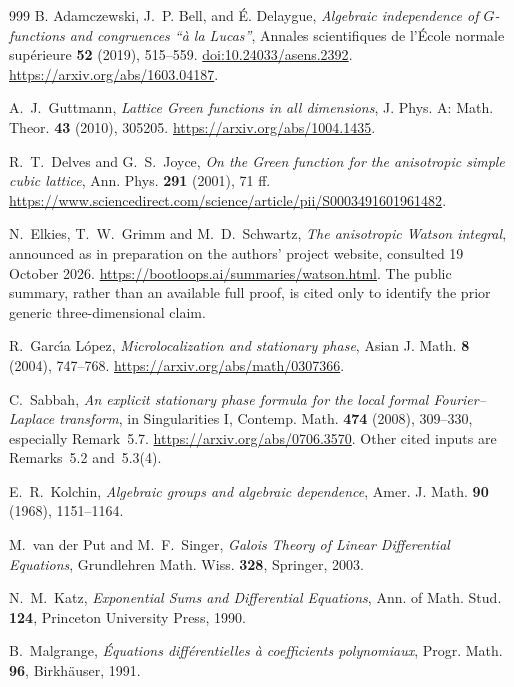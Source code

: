 \documentclass[11pt,a4paper]{article}
\theoremstyle{definition}
\theoremstyle{remark}
\numberwithin{equation}{section}
\begin{document}
\begin{thebibliography}{999}
B. Adamczewski, J.~P. Bell, and \'E. Delaygue,
\emph{Algebraic independence of $G$-functions and congruences
``\`a la Lucas''},
Annales scientifiques de l'\'Ecole normale sup\'erieure
\textbf{52} (2019), 515--559.
\href{https://doi.org/10.24033/asens.2392}{doi:10.24033/asens.2392}.
\url{https://arxiv.org/abs/1603.04187}.

A.~J.~Guttmann, \emph{Lattice Green functions in all dimensions},
J. Phys. A: Math. Theor. \textbf{43} (2010), 305205.
\url{https://arxiv.org/abs/1004.1435}.

R.~T.~Delves and G.~S.~Joyce,
\emph{On the Green function for the anisotropic simple cubic lattice},
Ann. Phys. \textbf{291} (2001), 71 ff.
\url{https://www.sciencedirect.com/science/article/pii/S0003491601961482}.

N.~Elkies, T.~W.~Grimm and M.~D.~Schwartz,
\emph{The anisotropic Watson integral}, announced as in preparation
on the authors' project website, consulted 19 October 2026.
\url{https://bootloops.ai/summaries/watson.html}.
The public summary, rather than an available full proof, is cited
only to identify the prior generic three-dimensional claim.

R.~Garc\'{\i}a L\'opez,
\emph{Microlocalization and stationary phase},
Asian J. Math. \textbf{8} (2004), 747--768.
\url{https://arxiv.org/abs/math/0307366}.

C.~Sabbah, \emph{An explicit stationary phase formula for the local
formal Fourier--Laplace transform}, in Singularities I,
Contemp. Math. \textbf{474} (2008), 309--330, especially Remark~5.7.
\url{https://arxiv.org/abs/0706.3570}.
Other cited inputs are Remarks~5.2 and~5.3(4).

E.~R.~Kolchin, \emph{Algebraic groups and algebraic dependence},
Amer. J. Math. \textbf{90} (1968), 1151--1164.

M.~van der Put and M.~F.~Singer,
\emph{Galois Theory of Linear Differential Equations},
Grundlehren Math. Wiss. \textbf{328}, Springer, 2003.

N.~M.~Katz, \emph{Exponential Sums and Differential Equations},
Ann. of Math. Stud. \textbf{124}, Princeton University Press, 1990.

B.~Malgrange, \emph{\'Equations diff\'erentielles \`a coefficients
polynomiaux}, Progr. Math. \textbf{96}, Birkh\"auser, 1991.


\end{thebibliography}
\end{document}
